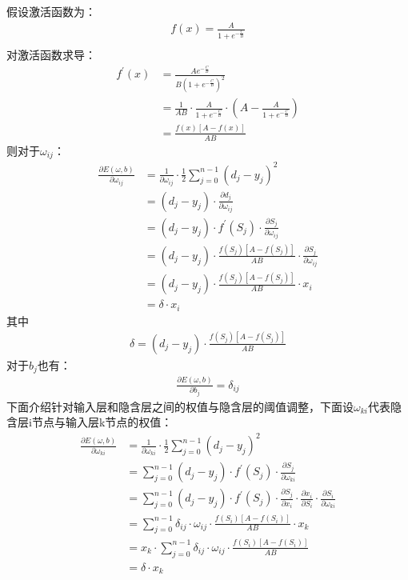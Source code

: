 假设激活函数为：\\
\begin{align}
    f(x) = \frac{A}{1+e^{-\frac{C}{B}}} \\
\end{align}
对激活函数求导：
\begin{align}
    f^{'}(x) &= \frac{Ae^{-\frac{C}{B}}}{B(1+e^{-\frac{C}{B}})^2} \\
    &=\frac{1}{AB} \cdot \frac{A}{1+e^{-\frac{C}{B}}} \cdot (A-\frac{A}{1+e^{-\frac{C}{B}}})\\
    &=\frac{f(x)[A-f(x)]}{AB}
\end{align}
则对于$\omega_{ij}$：
\begin{align}
    \frac{\partial E(\omega, b)}{\partial \omega_{ij}} &= \frac{1}{\partial \omega_{ij}} \cdot \frac{1}{2} \sum_{j=0}^{n-1} (d_j-y_j)^2 \\
    &=(d_j - y_j) \cdot \frac{\partial d_j}{\partial \omega_{ij}} \\
    &=(d_j-y_j) \cdot f^{'}(S_j) \cdot \frac{\partial S_j}{\partial \omega_{ij}} \\
    &=(d_j-y_j) \cdot \frac{f(S_j)[A-f(S_j)]}{AB} \cdot \frac{\partial S_j}{\partial \omega_{ij}} \\
    &=(d_j-y_j) \cdot \frac{f(S_j)[A-f(S_j)]}{AB} \cdot x_i \\
    &=\delta \cdot x_i
\end{align}
其中
\begin{align}
    \delta = (d_j-y_j) \cdot \frac{f(S_j)[A-f(S_j)]}{AB}
\end{align}
对于$b_j$也有：
\begin{align}
    \frac{\partial E(\omega, b)}{\partial b_j} = \delta_{ij}
\end{align}
下面介绍针对输入层和隐含层之间的权值与隐含层的阈值调整，下面设$\omega_{ki}$代表隐含层i节点与输入层k节点的权值：
\begin{align}
    \frac{\partial E(\omega , b)}{\partial \omega_{ki}} &=\frac{1}{\partial \omega_{ki}} \cdot \frac{1}{2} \sum_{j=0}^{n-1}(d_j-y_j)^2 \\
    &=\sum_{j=0}^{n-1} (d_j-y_j) \cdot f^{'}(S_j) \cdot \frac{\partial S_j}{\partial \omega_{ki}} \\
    &=\sum_{j=0}^{n-1} (d_j-y_j) \cdot f^{'}(S_j) \cdot \frac{\partial S_j}{\partial x_i} \cdot \frac{\partial x_i}{\partial S_i} \cdot \frac{\partial S_i}{\partial \omega_{ki}} \\
    &=\sum_{j=0}^{n-1} \delta_{ij} \cdot \omega_{ij} \cdot \frac{f(S_i)[A-f(S_i)]}{AB} \cdot x_k \\
    &=x_k \cdot \sum_{j=0}^{n-1} \delta_{ij} \cdot \omega_{ij} \cdot \frac{f(S_i)[A-f(S_i)]}{AB} \\
    &=\delta \cdot x_k
\end{align}
